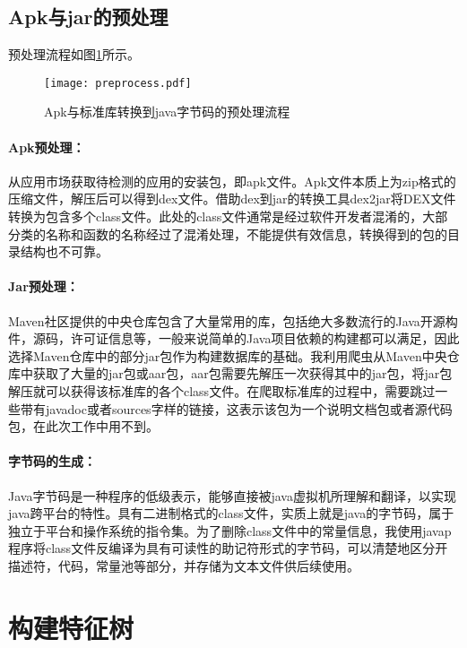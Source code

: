 \subsection{Apk与jar的预处理}

预处理流程如图\ref{fig:preprocess}所示。
\begin{figure}[!htp]
  \centering
  \texttt{[image: preprocess.pdf]} \\
  \caption{Apk与标准库转换到java字节码的预处理流程}
 \label{fig:preprocess}
\end{figure}

\paragraph{Apk预处理：}从应用市场获取待检测的应用的安装包，即apk文件。Apk文件本质上为zip格式的压缩文件，解压后可以得到dex文件。借助dex到jar的转换工具dex2jar\cite{d2j}将DEX文件转换为包含多个class文件。此处的class文件通常是经过软件开发者混淆的，大部分类的名称和函数的名称经过了混淆处理，不能提供有效信息，转换得到的包的目录结构也不可靠。


\paragraph{Jar预处理：}Maven社区提供的中央仓库\cite{maven}包含了大量常用的库，包括绝大多数流行的Java开源构件，源码，许可证信息等，一般来说简单的Java项目依赖的构建都可以满足，因此选择Maven仓库中的部分jar包作为构建数据库的基础。我利用爬虫从Maven中央仓库中获取了大量的jar包或aar包，aar包需要先解压一次获得其中的jar包，将jar包解压就可以获得该标准库的各个class文件。在爬取标准库的过程中，需要跳过一些带有javadoc或者sources字样的链接，这表示该包为一个说明文档包或者源代码包，在此次工作中用不到。


\paragraph{字节码的生成：}Java字节码是一种程序的低级表示，能够直接被java虚拟机所理解和翻译，以实现java跨平台的特性。具有二进制格式的class文件，实质上就是java的字节码，属于独立于平台和操作系统的指令集。为了删除class文件中的常量信息，我使用javap程序将class文件反编译为具有可读性的助记符形式的字节码，可以清楚地区分开描述符，代码，常量池等部分，并存储为文本文件供后续使用。




\section{构建特征树}

